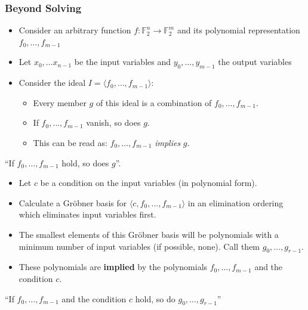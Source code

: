 \documentclass[9pt]{beamer}
\newcommand{\field}[1]{\mathbb{#1}}
\begin{document}
\begin{frame}[allowframebreaks]
\frametitle{Beyond Solving}
 
\begin{itemize}
\item Consider an arbitrary function \(f: \field{F}_2^n \to \field{F}_2^m\) and its polynomial representation \(f_0, \dots, f_{m-1}\)
\item Let \(x_{0}, \dots x_{n-1}\) be the input variables and \(y_{0}, \dots, y_{m-1}\) the output variables
\item Consider the ideal \(I= \langle f_0, \dots, f_{m-1}\rangle\):
\begin{itemize}
\item Every member \(g\) of this ideal is a combination of \( f_0, \dots, f_{m-1}\).
\item If \( f_{0}, \dots, f_{m-1}\) vanish, so does \(g\).
\item This can be read as: \( f_0, \dots, f_{m-1}\) \emph{implies} \(g\).
\end{itemize}
\end{itemize}           
\begin{block}{}
\begin{center}
``If \(f_0, \dots, f_{m-1}\) hold, so does \(g\)''.
\end{center}
\end{block}

\framebreak

\begin{itemize}
\item Let \(c\) be a condition on the input variables (in polynomial form).
\item Calculate a Gr\"obner basis for \(\langle c, f_0, \dots, f_{m-1}\rangle\) in an elimination ordering which eliminates input variables first.
\item The smallest elements of this Gr\"obner basis will be polynomials with a minimum number of input variables (if possible, none). Call them \(g_0, \dots, g_{r-1}\).
\item These polynomials are \textbf{implied} by the polynomials \(f_0, \dots, f_{m-1}\) and the condition \(c\).
\end{itemize}           

\begin{block}{}
\begin{center}
``If \(f_0, \dots, f_{m-1}\) and the condition \(c\) hold, so do \(g_0, \dots, g_{r-1}\)''
\end{center}
\end{block}


\end{frame}
\end{document}
